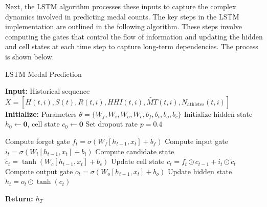 \documentclass{mcmthesis}
\begin{document}
Next, the LSTM algorithm processes these inputs to capture the complex dynamics involved in predicting medal counts. The key steps in the LSTM implementation are outlined in the following algorithm. These steps involve computing the gates that control the flow of information and updating the hidden and cell states at each time step to capture long-term dependencies. The process is shown below.
\begin{algorithm}
	\caption{LSTM Medal Prediction}
	\begin{algorithmic}[1]
		\State \textbf{Input:} Historical sequence \( X = [H(t,i), S(t), R(t,i), HHI(t,i), \widetilde{MT}(t,i), N_{\text{athletes}}(t,i)] \)
		\State \textbf{Initialize:} Parameters \( \theta = \{W_f, W_i, W_o, W_c, b_f, b_i, b_o, b_c\} \)
		\State Initialize hidden state \( h_0 \gets \mathbf{0} \), cell state \( c_0 \gets \mathbf{0} \)
		\State Set dropout rate \( p = 0.4 \)
		
		\State Compute forget gate \( f_t = \sigma(W_f[h_{t-1}, x_t] + b_f) \)
		\State Compute input gate \( i_t = \sigma(W_i[h_{t-1}, x_t] + b_i) \)
		\State Compute candidate state \( \tilde{c}_t = \tanh(W_c[h_{t-1}, x_t] + b_c) \)
		\State Update cell state \( c_t = f_t \odot c_{t-1} + i_t \odot \tilde{c}_t \)
		\State Compute output gate \( o_t = \sigma(W_o[h_{t-1}, x_t] + b_o) \)
		\State Update hidden state \( h_t = o_t \odot \tanh(c_t) \)
		\EndFor
		
		\State \textbf{Return:} \( h_T \)
	\end{algorithmic}
\end{algorithm}
\end{document}
